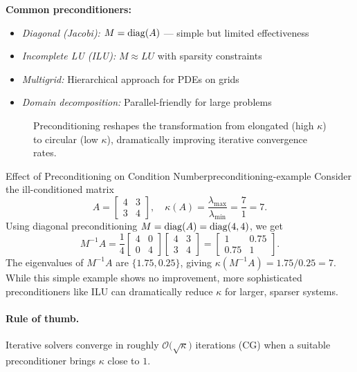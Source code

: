 \textbf{Common preconditioners:}
\begin{itemize}[nosep]
    \item \emph{Diagonal (Jacobi):} $M = \operatorname{diag}(A)$ — simple but limited effectiveness
    \item \emph{Incomplete LU (ILU):} $M \approx LU$ with sparsity constraints
    \item \emph{Multigrid:} Hierarchical approach for PDEs on grids
    \item \emph{Domain decomposition:} Parallel-friendly for large problems
\end{itemize}

\begin{figure}[htbp!]
    \centering
    
    \caption{Preconditioning reshapes the transformation from elongated (high $\kappa$) to circular (low $\kappa$), dramatically improving iterative convergence rates.}
    \label{fig:preconditioning}
\end{figure}

\begin{example}{Effect of Preconditioning on Condition Number}{preconditioning-example}
Consider the ill-conditioned matrix
\[
A = \begin{bmatrix} 4 & 3 \\ 3 & 4 \end{bmatrix}, \quad \kappa(A) = \frac{\lambda_{\max}}{\lambda_{\min}} = \frac{7}{1} = 7.
\]
Using diagonal preconditioning $M = \operatorname{diag}(A) = \operatorname{diag}(4, 4)$, we get
\[
M^{-1}A = \frac{1}{4}\begin{bmatrix} 4 & 0 \\ 0 & 4 \end{bmatrix} \begin{bmatrix} 4 & 3 \\ 3 & 4 \end{bmatrix} = \begin{bmatrix} 1 & 0.75 \\ 0.75 & 1 \end{bmatrix}.
\]
The eigenvalues of $M^{-1}A$ are $\{1.75, 0.25\}$, giving $\kappa(M^{-1}A) = 1.75/0.25 = 7$. While this simple example shows no improvement, more sophisticated preconditioners like ILU can dramatically reduce $\kappa$ for larger, sparser systems.
\end{example}

\paragraph{Rule of thumb.}
Iterative solvers converge in roughly $\mathcal{O}\big(\sqrt{\kappa}\big)$ iterations (CG) when a suitable preconditioner brings $\kappa$ close to $1$.


